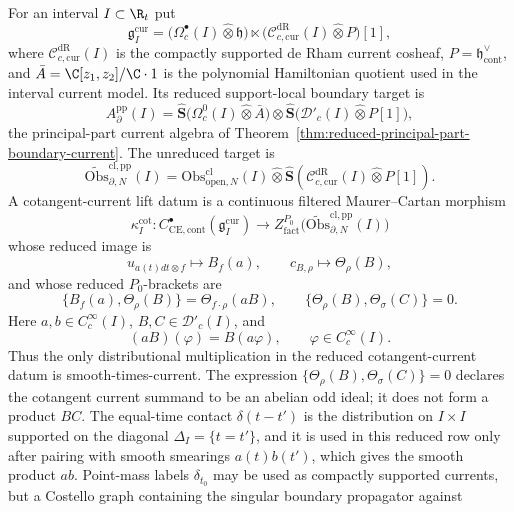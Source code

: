 \begin{defn}
\label{defn:typed-cotangent-current-lift-datum}
For an interval \(I\subset\R_t\) put
\[
  \mathfrak g_I^{\mathrm{cur}}
  =
  \bigl(\Omega^\bullet_c(I)\widehat\otimes\mathfrak h\bigr)
  \ltimes
  \bigl(\mathcal C^{\mathrm{dR}}_{c,\mathrm{cur}}(I)
  \widehat\otimes P\bigr)[1],
\]
where \(\mathcal C^{\mathrm{dR}}_{c,\mathrm{cur}}(I)\) is the compactly
supported de Rham current cosheaf,
\(P=\mathfrak h^\vee_{\mathrm{cont}}\), and
\(\bar A=\C[z_1,z_2]/\C\cdot1\) is the polynomial Hamiltonian quotient
used in the interval current model.
Its reduced support-local boundary target is
\[
  A^{\mathrm{pp}}_\partial(I)
  =
  \widehat{\mathbf S}\bigl(\Omega^0_c(I)\widehat\otimes\bar A\bigr)
  \widehat\otimes
  \widehat{\mathbf S}\bigl(\mathcal D'_c(I)\widehat\otimes P[1]\bigr),
\]
the principal-part current algebra of
Theorem~\ref{thm:reduced-principal-part-boundary-current}.  The
unreduced target is
\[
  \widetilde{\mathrm{Obs}}^{\mathrm{cl,pp}}_{\partial,N}(I)
  =
  \mathrm{Obs}^{\mathrm{cl}}_{\mathrm{open},N}(I)
  \widehat\otimes
  \widehat{\mathbf S}\!\left(
    \mathcal C^{\mathrm{dR}}_{c,\mathrm{cur}}(I)
    \widehat\otimes P[1]\right).
\]
A cotangent-current lift datum is a continuous filtered
Maurer--Cartan morphism
\[
  \kappa^{\mathrm{cot}}_I\colon
  C^\bullet_{\mathrm{CE},\mathrm{cont}}(\mathfrak g_I^{\mathrm{cur}})
  \longrightarrow
  Z^{P_0}_{\mathrm{fact}}\!
  \bigl(\widetilde{\mathrm{Obs}}^{\mathrm{cl,pp}}_{\partial,N}(I)\bigr)
\]
whose reduced image is
\[
  u_{a(t)dt\otimes f}\longmapsto B_f(a),\qquad
  c_{B,\rho}\longmapsto\Theta_\rho(B),
\]
and whose reduced \(P_0\)-brackets are
\[
  \{B_f(a),\Theta_\rho(B)\}=\Theta_{f\cdot\rho}(aB),\qquad
  \{\Theta_\rho(B),\Theta_\sigma(C)\}=0 .
\]
Here \(a,b\in C^\infty_c(I)\), \(B,C\in\mathcal D'_c(I)\), and
\[
  (aB)(\varphi)=B(a\varphi),\qquad \varphi\in C^\infty_c(I).
\]
Thus the only distributional multiplication in the reduced
cotangent-current datum is smooth-times-current.  The expression
\(\{\Theta_\rho(B),\Theta_\sigma(C)\}=0\) declares the cotangent current
summand to be an abelian odd ideal; it does not form a product \(BC\).
The equal-time contact \(\delta(t-t')\) is the distribution on
\(I\times I\) supported on the diagonal \(\Delta_I=\{t=t'\}\), and it is
used in this reduced row only after pairing with smooth smearings
\(a(t)b(t')\), which gives the smooth product \(ab\).  Point-mass labels
\(\delta_{t_0}\) may be used as compactly supported currents, but a
Costello graph containing the singular boundary propagator against

\end{defn}
